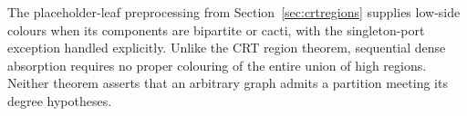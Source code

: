 The placeholder-leaf preprocessing from
Section~\ref{sec:crtregions} supplies low-side colours when its
components are bipartite or cacti, with the singleton-port exception
handled explicitly. Unlike the CRT region theorem, sequential dense
absorption requires no proper colouring of the entire union of high
regions. Neither theorem asserts that an arbitrary graph admits a
partition meeting its degree hypotheses.
